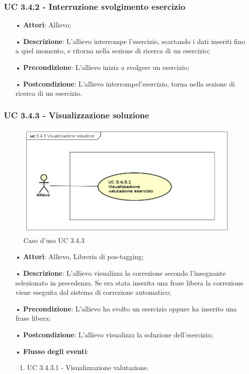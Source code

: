 \subsubsection{UC 3.4.2 - Interruzione svolgimento esercizio}
\begin{itemize}
\item[•]\textbf{Attori}: Allievo;
\item[•]\textbf{Descrizione}: L'allievo interrompe  l'esercizio, scartando i dati inseriti fino a quel momento, e ritorna nella sezione di ricerca di un esercizio;
\item[•]\textbf{Precondizione}: L'allievo inizia a svolgere un esercizio;
\item[•]\textbf{Postcondizione}: L'allievo interrompel'esercizio, torna nella sezione di ricerca di un esercizio.
\end{itemize}

\subsubsection{UC 3.4.3 - Visualizzazione soluzione}

\begin{figure}[H]
\centering
\includegraphics[width=17cm]{img/UC343.png} 
\caption{Caso d'uso UC 3.4.3}\label{fig:343}
\end{figure}

\begin{itemize}
\item[•]\textbf{Attori}: Allievo, Libreria di pos-tagging;
\item[•]\textbf{Descrizione}: L'allievo visualizza la correzione secondo l'insegnante selezionato in precedenza. Se era stata inserita una frase libera la correzione viene eseguita dal sistema di correzione automatico;
\item[•]\textbf{Precondizione}: L'allievo ha svolto un esercizio oppure ha inserito una frase libera;
\item[•]\textbf{Postcondizione}: L'allievo visualizza la soluzione dell'esercizio;
\item[•]\textbf{Flusso degli eventi}:
\begin{enumerate}
\item UC 3.4.3.1 - Visualizzazione valutazione.  %
\end{enumerate}
\end{itemize}

